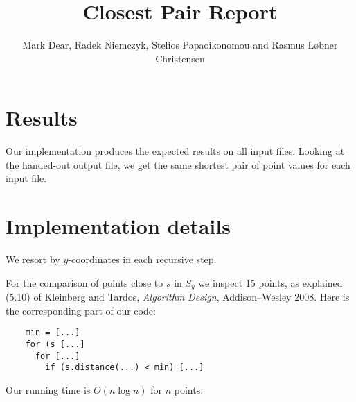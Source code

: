 \documentclass{tufte-handout}
\title{Closest Pair Report}
\author{Mark Dear, Radek Niemczyk, Stelios Papaoikonomou and Rasmus Løbner Christensen}
\begin{document}
  \maketitle

  \section{Results}

  Our implementation produces the expected results on all input files. Looking at the handed-out output file, we get the same shortest pair of point values for each input file.

  \section{Implementation details}

  We resort by $y$-coordinates in each recursive step.

  For the comparison of points close to $s$ in $S_y$ we inspect 15 points,
  as explained (5.10) of Kleinberg and Tardos, \emph{Algorithm Design}, Addison--Wesley 2008.
  Here is the corresponding part of our code:
  \begin{verbatim}
    min = [...]
    for (s [...]
      for [...]
        if (s.distance(...) < min) [...]
  \end{verbatim}

  Our running time is $O(n\log n)$ for $n$ points.
\end{document}

